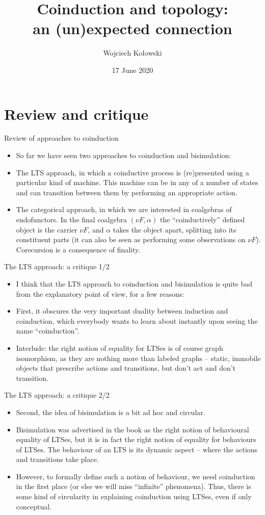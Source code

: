 \documentclass{beamer}
\title{Coinduction and topology:\\an (un)expected connection}
\author{Wojciech Kołowski}
\date{17 June 2020}
\begin{document}
\frame{\titlepage}
\frame{\tableofcontents}

\section{Review and critique}

\begin{frame}{Review of approaches to coinduction}
\begin{itemize}
	\item So far we have seen two approaches to coinduction and bisimulation:
	\item The LTS approach, in which a coinductive process is (re)presented using a particular kind of machine. This machine can be in any of a number of states and can transition between them by performing an appropriate action.
	\item The categorical approach, in which we are interested in coalgebras of endofunctors. In the final coalgebra $(\nu F, \alpha)$ the ``coinductively'' defined object is the carrier $\nu F$, and $\alpha$ takes the object apart, splitting into its constituent parts (it can also be seen as performing some observations on $\nu F$). Corecursion is a consequence of finality.
\end{itemize}
\end{frame}

\begin{frame}{The LTS approach: a critique 1/2}
\begin{itemize}
	\item I think that the LTS approach to coinduction and bisimulation is quite bad from the explanatory point of view, for a few reasons:
	\item First, it obscures the very important duality between induction and coinduction, which everybody wants to learn about instantly upon seeing the name ``coinduction''.
	\item Interlude: the right notion of equality for LTSes is of course graph isomorphism, as they are nothing more than labeled graphs -- static, immobile objects that prescribe actions and transitions, but don't act and don't transition.
\end{itemize}
\end{frame}

\begin{frame}{The LTS approach: a critique 2/2}
\begin{itemize}
	\item Second, the idea of bisimulation is a bit ad hoc and circular.
	\item Bisimulation was advertised in the book as the right notion of behavioural equality of LTSes, but it is in fact the right notion of equality for behaviours of LTSes. The behaviour of an LTS is its dynamic aspect -- where the actions and transitions take place.
	\item However, to formally define such a notion of behaviour, we need coinduction in the first place (or else we will miss ``infinite'' phenomena). Thus, there is some kind of circularity in explaining coinduction using LTSes, even if only conceptual.
\end{itemize}
\end{frame}
\end{document}
